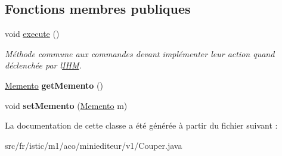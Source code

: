\subsection*{Fonctions membres publiques}
\begin{DoxyCompactItemize}
\item 
\mbox{\label{classfr_1_1istic_1_1m1_1_1aco_1_1miniediteur_1_1v1_1_1Couper_aa646ea059793eb7db2066175369cbdae}} 
void \hyperlink{classfr_1_1istic_1_1m1_1_1aco_1_1miniediteur_1_1v1_1_1Couper_aa646ea059793eb7db2066175369cbdae}{execute} ()
\begin{DoxyCompactList}\small\item\em Méthode commune aux commandes devant implémenter leur action quand déclenchée par l\textquotesingle{}\hyperlink{interfacefr_1_1istic_1_1m1_1_1aco_1_1miniediteur_1_1v1_1_1IHM}{I\+HM}. \end{DoxyCompactList}\item 
\mbox{\label{classfr_1_1istic_1_1m1_1_1aco_1_1miniediteur_1_1v1_1_1Couper_aa4f63cd2eb49ae3b96f175989d93c338}} 
\hyperlink{interfacefr_1_1istic_1_1m1_1_1aco_1_1miniediteur_1_1v1_1_1Memento}{Memento} {\bfseries get\+Memento} ()
\item 
\mbox{\label{classfr_1_1istic_1_1m1_1_1aco_1_1miniediteur_1_1v1_1_1Couper_a36f0578188f4526c624565c9afa4abc8}} 
void {\bfseries set\+Memento} (\hyperlink{interfacefr_1_1istic_1_1m1_1_1aco_1_1miniediteur_1_1v1_1_1Memento}{Memento} m)
\end{DoxyCompactItemize}


La documentation de cette classe a été générée à partir du fichier suivant \+:\begin{DoxyCompactItemize}
\item 
src/fr/istic/m1/aco/miniediteur/v1/Couper.\+java\end{DoxyCompactItemize}
